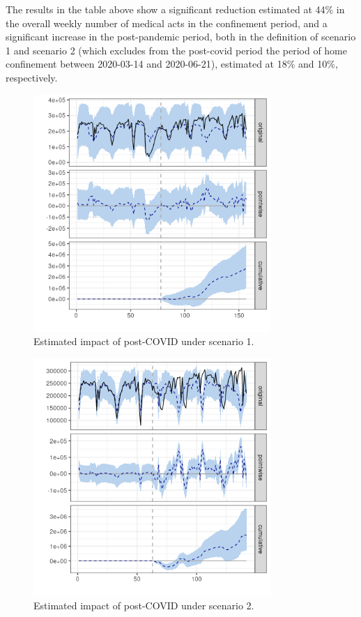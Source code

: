 \documentclass[9pt]{osa-supplemental-document}
\begin{document}
The results in the table above show a significant reduction estimated at 44\% in the overall weekly number of medical acts in the confinement period, and a significant increase in the post-pandemic period, both in the definition of scenario 1 and scenario 2 (which excludes from the post-covid period the period of home confinement between 2020-03-14 and 2020-06-21), estimated at 18\% and 10\%, respectively.

\begin{center}
\begin{figure}[H]
  \includegraphics[width=9cm]{global_post_scen1.png}\caption{Estimated impact of post-COVID under scenario 1.}
\end{figure}\label{global_postcovid1}
\end{center}

\begin{center}
    \begin{figure}[H]
      \includegraphics[width=9cm]{global_post_scen2.png}\caption{Estimated impact of post-COVID under scenario 2.}
    \end{figure}\label{global_postcovid2}
    \end{center}
\end{document}
